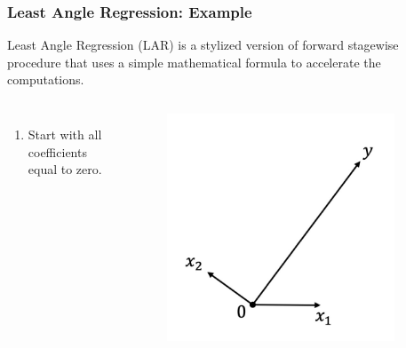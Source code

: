\begin{frame}
\frametitle{Least Angle Regression: Example}
Least Angle Regression (LAR) is a stylized version of forward stagewise procedure that uses a simple mathematical formula to accelerate the computations.

\begin{columns}[t]
    \begin{enumerate}
        \item Start with all coefficients equal to zero.
    \end{enumerate}
    
    \begin{figure}[!htbp]
        \begin{center}
            \includegraphics[width=0.9\textwidth]{img/LAR/1.jpeg}
        \end{center}
    \end{figure}
\end{columns}
\end{frame}

